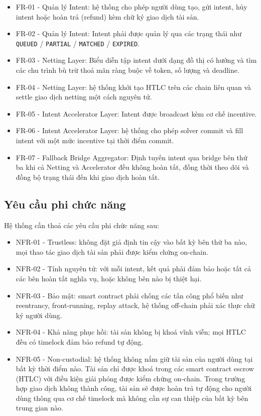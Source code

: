 \begin{itemize}
    \item FR-01 - Quản lý Intent: hệ thống cho phép người dùng tạo, gửi intent, hủy intent hoặc hoàn trả (refund) kèm chữ ký giao dịch tài sản.
    \item FR-02 - Quản lý Intent: Intent phải được quản lý qua các trạng thái như \texttt{QUEUED} / \texttt{PARTIAL} / \texttt{MATCHED} / \texttt{EXPIRED}.
    \item FR-03 - Netting Layer: Biểu diễn tập intent dưới dạng đồ thị có hướng và tìm các chu trình bù trừ thoả mãn ràng buộc về token, số lượng và deadline.
    \item FR-04 - Netting Layer: hệ thống khởi tạo HTLC trên các chain liên quan và settle giao dịch netting một cách nguyên tử.
    \item FR-05 - Intent Accelerator Layer: Intent được broadcast kèm cơ chế incentive.
    \item FR-06 - Intent Accelerator Layer: hệ thống cho phép solver commit và fill intent với một mức incentive tại thời điểm commit.
    \item FR-07 - Fallback Bridge Aggregator: Định tuyến intent qua bridge bên thứ ba khi cả Netting và Accelerator đều không hoàn tất, đồng thời theo dõi và đồng bộ trạng thái đến khi giao dịch hoàn tất.
\end{itemize}

\subsection{Yêu cầu phi chức năng}

Hệ thống cần thoả các yêu cầu phi chức năng sau:

\begin{itemize}
    \item NFR-01 - Trustless: không đặt giả định tin cậy vào bất kỳ bên thứ ba nào, mọi thao tác giao dịch tài sản phải được kiểm chứng on-chain.
    \item NFR-02 - Tính nguyên tử: với mỗi intent, kết quả phải đảm bảo hoặc tất cả các bên hoàn tất nghĩa vụ, hoặc không bên nào bị thiệt hại.
    \item NFR-03 - Bảo mật: smart contract phải chống các tấn công phổ biến như reentrancy, front-running, replay attack, hệ thống off-chain phải xác thực chữ ký người dùng.
    \item NFR-04 - Khả năng phục hồi: tài sản không bị khoá vĩnh viễn; mọi HTLC đều có timelock đảm bảo refund tự động.
    \item NFR-05 - Non-custodial: hệ thống không nắm giữ tài sản của người dùng tại bất kỳ thời điểm nào. Tài sản chỉ được khoá trong các smart contract escrow (HTLC) với điều kiện giải phóng được kiểm chứng on-chain. Trong trường hợp giao dịch không thành công, tài sản sẽ được hoàn trả tự động cho người dùng thông qua cơ chế timelock mà không cần sự can thiệp của bất kỳ bên trung gian nào.
\end{itemize}

